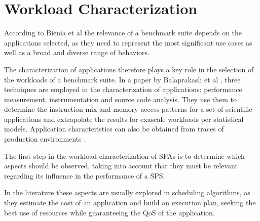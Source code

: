 \documentclass[ppgc,diss,english]{iiufrgs}
\begin{document}
\section{Workload Characterization}
\label{sec:esp:workload_characterization}

According to Bienia et al \cite{bienia2008parsec} the relevance of a benchmark suite depends on the applications selected, as they need to represent the most significant use cases as well as a broad and diverse range of behaviors.

The characterization of applications therefore plays a key role in the selection of the workloads of a benchmark suite. In a paper by Balaprakash et al \cite{balaprakash2013exascale}, three techniques are employed in the characterization of applications: performance measurement, instrumentation and source code analysis. They use them to determine the instruction mix and memory access patterns for a set of scientific applications and extrapolate the results for exascale workloads per statistical models. Application characteristics can also be obtained from traces of production environments \cite{khan2012workload}.




The first step in the workload characterization of SPAs is to determine which aspects should be observed, taking into account that they must be relevant regarding its influence in the performance of a SPS.

In the literature these aspects are usually explored in scheduling algorithms, as they estimate the cost of an application and build an execution plan, seeking the best use of resources while guaranteeing the QoS of the application.
\end{document}
